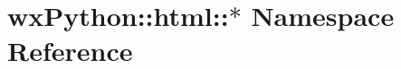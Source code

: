 \hypertarget{namespacewxPython_1_1html_1_1_5}{
\section{wx\-Python::html::$\ast$ Namespace Reference}
\label{namespacewxPython_1_1html_1_1_5}
}


